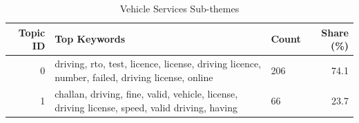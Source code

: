 \begin{table}[htbp]
\centering
\caption{Vehicle Services Sub-themes}
\label{tab:topics_Vehicle_Services}
\begin{tabular}{rlp{7cm}r}
\toprule
Topic ID & Top Keywords & Count & Share (\%) \\
\midrule
0 & driving, rto, test, licence, license, driving licence, number, failed, driving license, online & 206 & 74.1 \\
1 & challan, driving, fine, valid, vehicle, license, driving license, speed, valid driving, having & 66 & 23.7 \\
\bottomrule
\end{tabular}
\end{table}